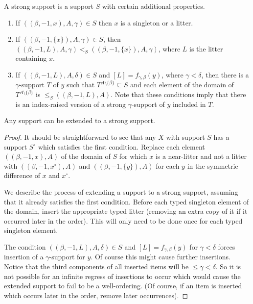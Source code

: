 \begin{definition}
\label{def:strong-support}
A strong support is a support $S$ with certain additional properties.

\begin{enumerate}
\item  If $((\beta,-1,x),A,\gamma) \in S$ then $x$ is a singleton or a litter.

\item  If $((\beta,-1,\{x\}),A,\gamma) \in S$, then $((\beta,-1,L),A,\gamma) <_S ((\beta,-1,\{x\}),A,\gamma)$, where $L$ is the litter containing $x$.

\item  If $((\beta,-1,L),A,\delta) \in S$ and $[L]=f_{\gamma,\beta}(y)$, where $\gamma<\delta$, then there is a $\gamma$-support $T$ of $y$ such that $T^{A \setminus \{\beta\}} \subseteq S$ and each element of the domain of $T^{A \setminus \{\beta\}}$ is $\leq_S ((\beta,-1,L),A)$.  Note that these conditions imply that there is an index-raised version of a strong $\gamma$-support of $y$ included in $T$.
\end{enumerate}
\end{definition}

\begin{lemma}
\label {lem:strengthen-support}
Any support can be extended to a strong support.
\end{lemma}

\begin{proof}
It should be straightforward to see that any $X$ with support $S$ has a support $S^\circ$ which satisfies the first condition.  Replace each element $((\beta,-1,x),A)$ of the domain of $S$ for which $x$ is a near-litter and not a litter with $((\beta,-1,x^\circ),A)$ and $((\beta,-1,\{y\}),A)$ for each $y$ in the symmetric difference of $x$ and $x^\circ$.

We describe the process of extending a support to a strong support, assuming that it already satisfies the first condition.  Before each typed singleton element of the domain, insert the appropriate typed litter (removing an extra copy of it if it occurred later in the order).  This will only need to be done once for each typed singleton element.

The condition $((\beta,-1,L),A,\delta) \in S$ and $[L]=f_{\gamma,\beta}(y)$ for $\gamma<\delta$ forces insertion of a $\gamma$-support for $y$.  Of course this might cause further insertions.  Notice that the third components of all inserted items will be $\leq \gamma <\delta$.  So it is not possible for an infinite regress of insertions to occur which would cause the extended support to fail to be a well-ordering.  (Of course, if an item is inserted which occurs later in the order, remove later occurrences).
\end{proof}


